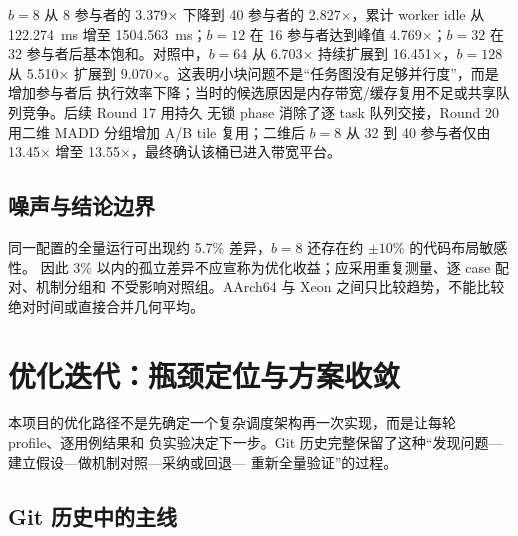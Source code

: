 \documentclass[UTF8,a4paper,openany,11pt,fontset=fandol]{ctexrep}
\begin{document}
\(b=8\) 从 8 参与者的 3.379× 下降到 40 参与者的 2.827×，累计 worker idle 从
122.274~ms 增至 1504.563~ms；\(b=12\) 在 16 参与者达到峰值 4.769×；\(b=32\) 在
32 参与者后基本饱和。对照中，\(b=64\) 从 6.703× 持续扩展到 16.451×，\(b=128\)
从 5.510× 扩展到 9.070×。这表明小块问题不是“任务图没有足够并行度”，而是增加参与者后
执行效率下降；当时的候选原因是内存带宽/缓存复用不足或共享队列竞争。后续 Round 17 用持久
无锁 phase 消除了逐 task 队列交接，Round 20 用二维 MADD 分组增加 A/B tile 复用；二维后
\(b=8\) 从 32 到 40 参与者仅由 13.45× 增至 13.55×，最终确认该桶已进入带宽平台。

\section{噪声与结论边界}

\begin{warningbox}[title=性能数字的使用边界]
同一配置的全量运行可出现约 5.7\% 差异，\(b=8\) 还存在约 \(\pm10\%\) 的代码布局敏感性。
因此 3\% 以内的孤立差异不应宣称为优化收益；应采用重复测量、逐 case 配对、机制分组和
不受影响对照组。AArch64 与 Xeon 之间只比较趋势，不能比较绝对时间或直接合并几何平均。
\end{warningbox}

\chapter{优化迭代：瓶颈定位与方案收敛}

本项目的优化路径不是先确定一个复杂调度架构再一次实现，而是让每轮 profile、逐用例结果和
负实验决定下一步。Git 历史完整保留了这种“发现问题---建立假设---做机制对照---采纳或回退---
重新全量验证”的过程。

\section{Git 历史中的主线}
\end{document}
